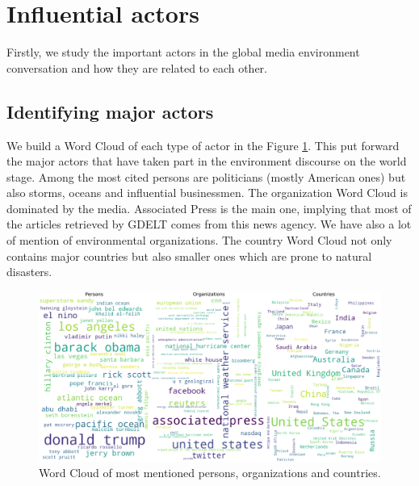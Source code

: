 \documentclass[11pt]{article}
\begin{document}
\section{Influential actors}
Firstly, we study the important actors in the global media environment conversation and how they are related to each other.

\subsection{Identifying major actors}
\label{WordCloud}
We build a Word Cloud of each type of actor in the Figure \ref{actors}. This put forward the major actors that have taken part in the environment discourse on the world stage. Among the most cited persons are politicians (mostly American ones) but also storms, oceans and influential businessmen. The organization Word Cloud is dominated by the media. Associated Press is the main one, implying that most of the articles retrieved by GDELT comes from this news agency. We have also a lot of mention of environmental organizations. The country Word Cloud not only contains major countries but also smaller ones which are prone to natural disasters.

\begin{figure}
   \includegraphics[scale=0.25]{wordcloud_global.png}
    \caption{\label{actors} Word Cloud of most mentioned persons, organizations and countries.}
\end{figure}
\end{document}
